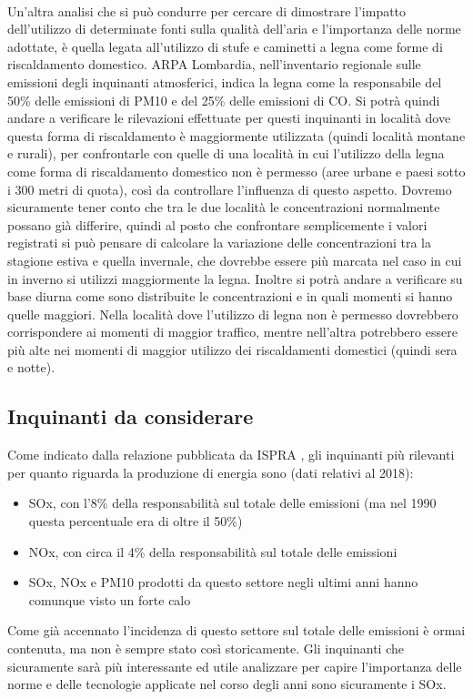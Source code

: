 \documentclass{article}
\begin{document}
\\Un'altra analisi che si può condurre per cercare di dimostrare l'impatto dell'utilizzo di determinate fonti sulla qualità dell'aria e l'importanza delle norme adottate, è quella legata all'utilizzo di stufe e caminetti a legna come forme di riscaldamento domestico. ARPA Lombardia, nell'inventario regionale sulle emissioni degli inquinanti atmosferici\cite{inemar2017}, indica la legna come la responsabile del 50\% delle emissioni di PM10 e del 25\% delle emissioni di CO. Si potrà quindi andare a verificare le rilevazioni effettuate per questi inquinanti in località dove questa forma di riscaldamento è maggiormente utilizzata (quindi località montane e rurali), per confrontarle con quelle di una località in cui l'utilizzo della legna come forma di riscaldamento domestico non è permesso (aree urbane e paesi sotto i 300 metri di quota), così da controllare l'influenza di questo aspetto. Dovremo sicuramente tener conto che tra le due località le concentrazioni normalmente possano già differire, quindi al posto che confrontare semplicemente i valori registrati si può pensare di calcolare la variazione delle concentrazioni tra la stagione estiva e quella invernale, che dovrebbe essere più marcata nel caso in cui in inverno si utilizzi maggiormente la legna. Inoltre si potrà andare a verificare su base diurna come sono distribuite le concentrazioni e in quali momenti si hanno quelle maggiori. Nella località dove l'utilizzo di legna non è permesso dovrebbero corrispondere ai momenti di maggior traffico, mentre nell'altra potrebbero essere più alte nei momenti di maggior utilizzo dei riscaldamenti domestici (quindi sera e notte).

\subsection{Inquinanti da considerare}
Come indicato dalla relazione pubblicata da ISPRA \cite{iir2020}, gli inquinanti più rilevanti per quanto riguarda la produzione di energia sono (dati relativi al 2018): 
\begin{itemize}
	\item SOx, con l'8\% della responsabilità sul totale delle emissioni (ma nel 1990 questa percentuale era di oltre il 50\%)
	\item NOx, con circa il 4\% della responsabilità sul totale delle emissioni
	\item SOx, NOx e PM10 prodotti da questo settore negli ultimi anni hanno comunque visto un forte calo
\end{itemize}
Come già accennato l'incidenza di questo settore sul totale delle emissioni è ormai contenuta, ma non è sempre stato così storicamente. Gli inquinanti che sicuramente sarà più interessante ed utile analizzare per capire l'importanza delle norme e delle tecnologie applicate nel corso degli anni sono sicuramente i SOx.
\newpage
\end{document}
